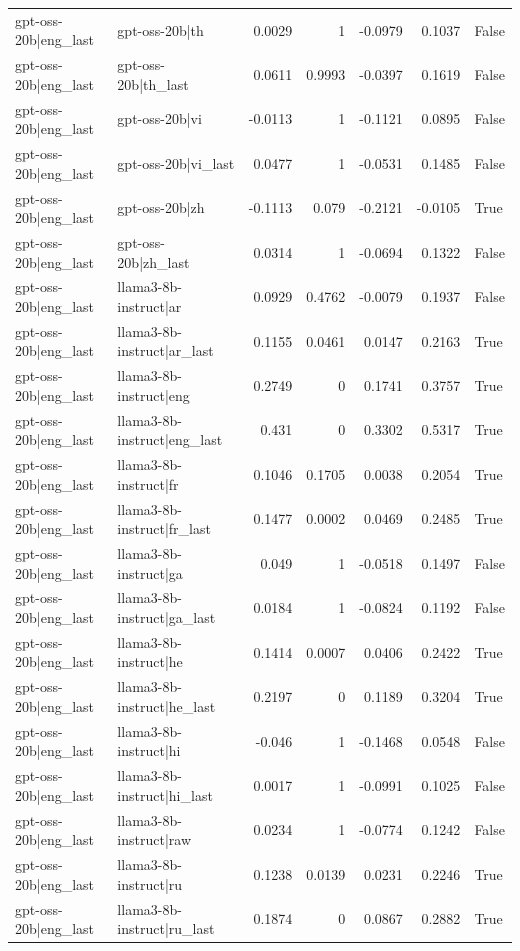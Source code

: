 \begin{table}
\begin{tabular}{l l r r r r l}
gpt-oss-20b|eng_last & gpt-oss-20b|th & 0.0029 & 1 & -0.0979 & 0.1037 & False \\
gpt-oss-20b|eng_last & gpt-oss-20b|th_last & 0.0611 & 0.9993 & -0.0397 & 0.1619 & False \\
gpt-oss-20b|eng_last & gpt-oss-20b|vi & -0.0113 & 1 & -0.1121 & 0.0895 & False \\
gpt-oss-20b|eng_last & gpt-oss-20b|vi_last & 0.0477 & 1 & -0.0531 & 0.1485 & False \\
gpt-oss-20b|eng_last & gpt-oss-20b|zh & -0.1113 & 0.079 & -0.2121 & -0.0105 & True \\
gpt-oss-20b|eng_last & gpt-oss-20b|zh_last & 0.0314 & 1 & -0.0694 & 0.1322 & False \\
gpt-oss-20b|eng_last & llama3-8b-instruct|ar & 0.0929 & 0.4762 & -0.0079 & 0.1937 & False \\
gpt-oss-20b|eng_last & llama3-8b-instruct|ar_last & 0.1155 & 0.0461 & 0.0147 & 0.2163 & True \\
gpt-oss-20b|eng_last & llama3-8b-instruct|eng & 0.2749 & 0 & 0.1741 & 0.3757 & True \\
gpt-oss-20b|eng_last & llama3-8b-instruct|eng_last & 0.431 & 0 & 0.3302 & 0.5317 & True \\
gpt-oss-20b|eng_last & llama3-8b-instruct|fr & 0.1046 & 0.1705 & 0.0038 & 0.2054 & True \\
gpt-oss-20b|eng_last & llama3-8b-instruct|fr_last & 0.1477 & 0.0002 & 0.0469 & 0.2485 & True \\
gpt-oss-20b|eng_last & llama3-8b-instruct|ga & 0.049 & 1 & -0.0518 & 0.1497 & False \\
gpt-oss-20b|eng_last & llama3-8b-instruct|ga_last & 0.0184 & 1 & -0.0824 & 0.1192 & False \\
gpt-oss-20b|eng_last & llama3-8b-instruct|he & 0.1414 & 0.0007 & 0.0406 & 0.2422 & True \\
gpt-oss-20b|eng_last & llama3-8b-instruct|he_last & 0.2197 & 0 & 0.1189 & 0.3204 & True \\
gpt-oss-20b|eng_last & llama3-8b-instruct|hi & -0.046 & 1 & -0.1468 & 0.0548 & False \\
gpt-oss-20b|eng_last & llama3-8b-instruct|hi_last & 0.0017 & 1 & -0.0991 & 0.1025 & False \\
gpt-oss-20b|eng_last & llama3-8b-instruct|raw & 0.0234 & 1 & -0.0774 & 0.1242 & False \\
gpt-oss-20b|eng_last & llama3-8b-instruct|ru & 0.1238 & 0.0139 & 0.0231 & 0.2246 & True \\
gpt-oss-20b|eng_last & llama3-8b-instruct|ru_last & 0.1874 & 0 & 0.0867 & 0.2882 & True \\

\end{tabular}
\end{table}
